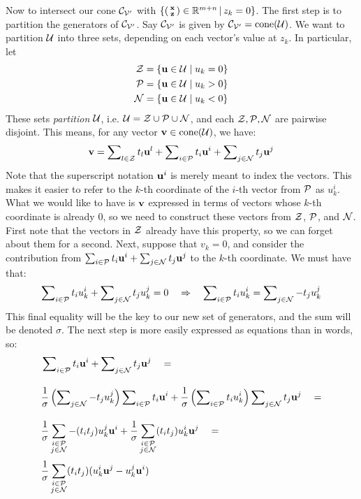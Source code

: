 Now to intersect our cone $\CVp$ with $\smallsetzeq{z_k}{0}$.  The first step is to partition the generators of $\CVp$.  Say $\CVp$ is given by $\CVp = \cone(\U)$.  We want to partition $\U$ into three sets, depending on each vector's value at $z_k$.  In particular, let
  \begin{align*} \Z &= \{\u \in \U \suchthat u_k = 0\} \\
                 \P &= \{\u \in \U \suchthat u_k > 0\} \\
                 \N &= \{\u \in \U \suchthat u_k < 0\} 
  \end{align*}
  These sets \textit{partition} $\U$, i.e. $\U = \Z \cup \P \cup \N$, and each $\Z, \P, \N$ are pairwise disjoint.  This means, for any vector $\v \in \cone(\U)$, we have:
  \[ \v = \setsum{t}{l}{\Z} +
          \setsum{t}{i}{\P} +
          \setsum{t}{j}{\N}
  \] 
Note that the superscript notation $\u^i$ is merely meant to index the vectors.  This makes it easier to refer to the $k$-th coordinate of the $i$-th vector from $\P$ as $u^i_k$.  What we would like to have is $\v$ expressed in terms of vectors whose $k$-th coordinate is already $0$, so we need to construct these vectors from $\Z$, $\P$, and $\N$.  First note that the vectors in $\Z$ already have this property, so we can forget about them for a second.  Next, suppose that $v_k = 0$, and consider the contribution from ${\setsum{t}{i}{\P} + \setsum{t}{j}{\N}}$ to the $k$-th coordinate.  We must have that:
  \[ \setsumk{t}{i}{\P} + \setsumk{t}{j}{\N} = 0
      \quad\Rightarrow\quad
     \setsumk{t}{i}{\P} = \setsumk{-t}{j}{\N}
  \]
This final equality will be the key to our new set of generators, and the sum will be denoted $\sigma$.  The next step is more easily expressed as equations than in words, so:
\begin{align*}
  & \setsum{t}{i}{\P} + \setsum{t}{j}{\N} \quad= \\[1em]
  & \frac{1}{\sigma}\left(\setsumk{-t}{j}{\N}\right)\setsum{t}{i}{\P} + 
      \frac{1}{\sigma}\left(\setsumk{t}{i}{\P}\right)\setsum{t}{j}{\N} \quad= \\[1em]
  & \frac{1}{\sigma}\sum_{\substack{i\in\P\\j\in\N}} -(t_i t_j)u^j_k\u^i + 
      \frac{1}{\sigma}\sum_{\substack{i\in\P\\j\in\N}} (t_i t_j)u^i_k\u^j \quad= \\[3pt]
  & \frac{1}{\sigma}\sum_{\substack{i\in\P\\j\in\N}} (t_i t_j) (u^i_k\u^j - u^j_k\u^i)
\end{align*}
